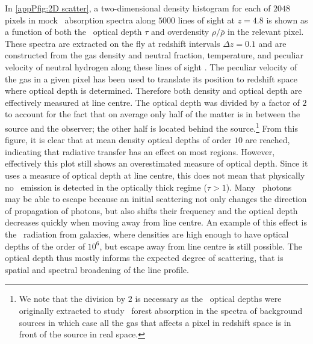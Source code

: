 In \cref{appPfig:2D scatter}, a two-dimensional density histogram for each of $2048$ pixels in mock \lya\ absorption spectra along $5000$ lines of sight at $z=4.8$ is shown as a function of both the \lya\ optical depth $\tau$ and overdensity $\rho/\bar{\rho}$ in the relevant pixel. These spectra are extracted on the fly at redshift intervals $\Delta z = 0.1$ and are constructed from the gas density and neutral fraction, temperature, and peculiar velocity of neutral hydrogen along these lines of sight \citep[for details, see][ where they are studied in the context of the \lya\ forest]{2017MNRAS.464..897B}. The peculiar velocity of the gas in a given pixel has been used to translate its position to redshift space where optical depth is determined. Therefore both density and optical depth are effectively measured at line centre. The optical depth was divided by a factor of $2$ to account for the fact that on average only half of the matter is in between the source and the observer; the other half is located behind the source.\footnote{We note that the division by $2$ is necessary as the \lya\ optical depths were originally extracted to study \lya\ forest absorption in the spectra of background sources in which case all the gas that affects a pixel in redshift space is in front of the source in real space.} From this figure, it is clear that at mean density optical depths of order $10$ are reached, indicating that radiative transfer has an effect on most regions. However, effectively this plot still shows an overestimated measure of optical depth. Since it uses a measure of optical depth at line centre, this does not mean that physically no \lya\ emission is detected in the optically thick regime ($\tau > 1$). Many \lya\ photons may be able to escape because an initial scattering not only changes the direction of propagation of photons, but also shifts their frequency and the optical depth decreases quickly when moving away from line centre. An example of this effect is the \lya\ radiation from galaxies, where densities are high enough to have optical depths of the order of $10^6$, but escape away from line centre is still possible. The optical depth thus mostly informs the expected degree of scattering, that is spatial and spectral broadening of the line profile.

